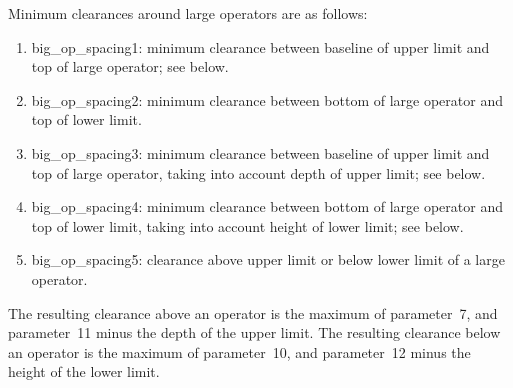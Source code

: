 \documentclass[twoside,letterpaper,openright]{rapport3}
\begin{document}
Minimum clearances around large operators are as follows:
\begin{enumerate} %
\item big\_op\_spacing1:
minimum clearance between baseline of upper limit and top
of large operator; see below.
\item big\_op\_spacing2:
minimum clearance between bottom of large operator and top of 
lower limit.
\item big\_op\_spacing3:
minimum clearance between baseline of
upper limit and top of large operator,
taking into account depth of upper limit; see below.
\item big\_op\_spacing4:
minimum clearance between bottom of large operator and top of lower
limit, taking into account height of lower limit; see below.
\item big\_op\_spacing5:
clearance above upper limit or below lower limit of a large operator.
\end{enumerate}
The resulting clearance above an operator is the maximum
of parameter~7, and parameter~11 minus the depth of the
upper limit.
The resulting clearance below an operator is the maximum
of parameter~10, and parameter~12 minus the height of the
lower limit.
\end{document}

